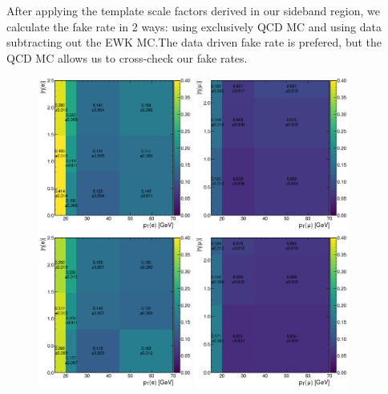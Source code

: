 After applying the template scale factors derived in our sideband region, we calculate the fake rate in 2 ways: using exclusively QCD MC and using data subtracting out the EWK MC.\@ The data driven fake rate is prefered, but the QCD MC allows us to cross-check our fake rates.

\begin{figure}
  \centering
  \includegraphics[width=0.45\textwidth]{measurement/2016/fr_data_ewk_Electron.png} \hfill
  \includegraphics[width=0.45\textwidth]{measurement/2016/fr_data_ewk_Muon.png} \\
  \includegraphics[width=0.45\textwidth]{measurement/2016/fr_qcd_Electron.png} \hfill
  \includegraphics[width=0.45\textwidth]{measurement/2016/fr_qcd_Muon.png} \\

\end{figure}

